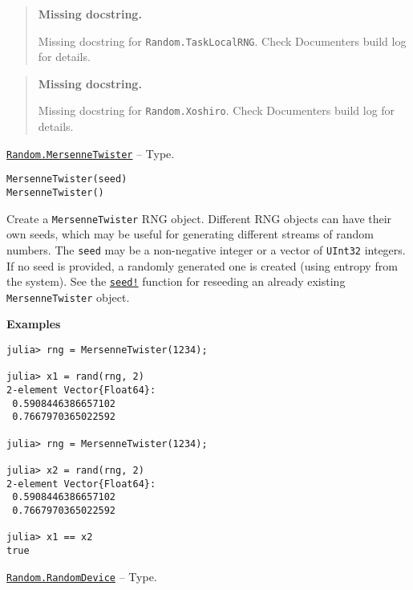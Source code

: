 \begin{quote}
\textbf{Missing docstring.}

Missing docstring for \texttt{Random.TaskLocalRNG}. Check Documenter{\textquotesingle}s build log for details.

\end{quote}


\begin{quote}
\textbf{Missing docstring.}

Missing docstring for \texttt{Random.Xoshiro}. Check Documenter{\textquotesingle}s build log for details.

\end{quote}

\hypertarget{4960058165975837552}{}
\hyperlink{4960058165975837552}{\texttt{Random.MersenneTwister}}  -- {Type.}

\begin{adjustwidth}{2em}{0pt}


\begin{verbatim}
MersenneTwister(seed)
MersenneTwister()
\end{verbatim}

Create a \texttt{MersenneTwister} RNG object. Different RNG objects can have their own seeds, which may be useful for generating different streams of random numbers. The \texttt{seed} may be a non-negative integer or a vector of \texttt{UInt32} integers. If no seed is provided, a randomly generated one is created (using entropy from the system). See the \hyperlink{9373195541397142847}{\texttt{seed!}} function for reseeding an already existing \texttt{MersenneTwister} object.

\textbf{Examples}


\begin{verbatim}
julia> rng = MersenneTwister(1234);

julia> x1 = rand(rng, 2)
2-element Vector{Float64}:
 0.5908446386657102
 0.7667970365022592

julia> rng = MersenneTwister(1234);

julia> x2 = rand(rng, 2)
2-element Vector{Float64}:
 0.5908446386657102
 0.7667970365022592

julia> x1 == x2
true
\end{verbatim}



\end{adjustwidth}
\hypertarget{14367539717133476780}{}
\hyperlink{14367539717133476780}{\texttt{Random.RandomDevice}}  -- {Type.}

